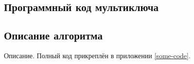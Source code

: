 \newpage
		\begin{center}	
				\section{Программный код мультиключа}
		\end{center}
    	\subsection{Описание алгоритма}
    Описание.
    	\newline
    	\newline
    	Полный код прикреплён в приложении \ref{some-code}.
    	
    
	
	